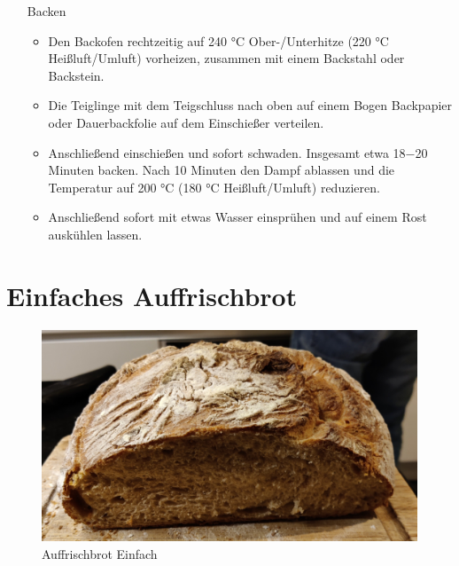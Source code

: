 \documentclass[10pt,a4paper,ngerman, DIV=16]{scrartcl}
\begin{document}
\begin{enumerate}
\begin{itemize}
    \end{itemize}
    \item [Backen]
    \begin{itemize}
        \item Den Backofen rechtzeitig auf 240 °C Ober-/Unterhitze (220 °C Heißluft/Umluft) vorheizen, zusammen mit einem Backstahl oder Backstein.
        \item Die Teiglinge mit dem Teigschluss nach oben auf einem Bogen Backpapier oder Dauerbackfolie auf dem Einschießer verteilen.
        \item Anschließend einschießen und sofort schwaden. Insgesamt etwa 18−20 Minuten backen. Nach 10 Minuten den Dampf ablassen und die Temperatur auf 200 °C (180 °C Heißluft/Umluft) reduzieren.
        \item Anschließend sofort mit etwas Wasser einsprühen und auf einem Rost auskühlen lassen.
    \end{itemize}
\end{enumerate}

\section{Einfaches Auffrischbrot}  
\begin{figure}
    \centering
    \includegraphics[width=0.7\linewidth]{Bilder/AuffrischbrotEinfach}
    \caption{Auffrischbrot Einfach}
    \label{fig:auffrischbroteinfach}
\end{figure}
\end{document}
